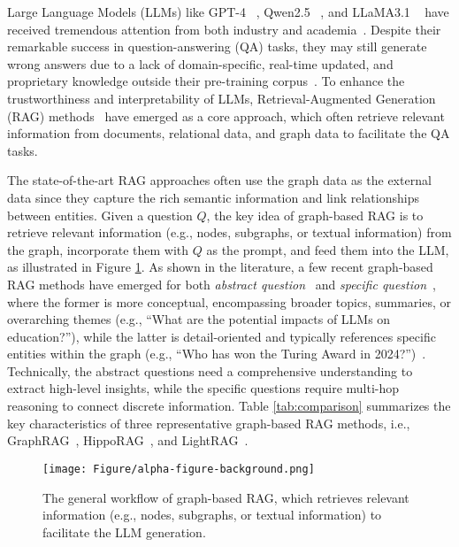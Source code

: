 Large Language Models (LLMs) like GPT-4 ~\cite{achiam2023gpt}, Qwen2.5 ~\cite{yang2024qwen2}, and LLaMA3.1 ~\cite{dubey2024llama} have received tremendous attention from both industry and academia~\cite{huang2024survey,liu2024survey,wang2024survey,zheng2024large,li2023large,nie2024survey,ghimire2024generative,wang2024large}.
% 
Despite their remarkable success in question-answering (QA) tasks, they may still generate wrong answers due to a lack of domain-specific, real-time updated, and proprietary knowledge outside their pre-training corpus~\cite{peng2024graph}. 
% 
To enhance the trustworthiness and interpretability of LLMs, Retrieval-Augmented Generation (RAG)  methods~\cite{fan2024survey,gao2023retrieval,hu2024rag,huang2024survey,wu2024retrieval,yu2024evaluation,zhao2024retrieval} have emerged as a core approach, which often retrieve relevant information from documents, relational data, and graph data to facilitate the QA tasks.

The state-of-the-art RAG approaches often use the graph data as the external data since they capture the rich semantic information and link relationships between entities. 
% 
Given a question $Q$, the key idea of graph-based RAG is to retrieve relevant information (e.g., nodes, subgraphs, or textual information) from the graph, incorporate them with $Q$ as the prompt, and feed them into the LLM, as illustrated in Figure \ref{fig:dual-tasks}.
%
As shown in the literature, a few recent graph-based RAG methods have emerged for both {\it abstract question}~\cite{edge2024local,guo2024lightrag,sarthi2024raptor} and {\it specific question}~\cite{guo2024lightrag,sarthi2024raptor,wu2024medical,wang2024knowledge,li2024dalk,gutierrez2024hipporag},
where the former is more conceptual, encompassing broader topics, summaries, or overarching themes (e.g., ``What are the potential impacts of LLMs on education?''), while the latter is detail-oriented and typically references specific entities within the graph  (e.g., ``Who has won the Turing Award in 2024?'')~\cite{guo2024lightrag}.
%
Technically, the abstract questions need a comprehensive understanding to extract high-level insights, while the specific questions require multi-hop reasoning to connect discrete information.
%
Table \ref{tab:comparison} summarizes the key characteristics of three representative graph-based RAG methods, i.e.,  GraphRAG~\cite{edge2024local}, HippoRAG~\cite{gutierrez2024hipporag}, and LightRAG~\cite{guo2024lightrag}.

\begin{figure}[t]
    \centering
    \texttt{[image: Figure/alpha-figure-background.png]}
    \caption{The general workflow of graph-based RAG, which retrieves relevant information (e.g., nodes, subgraphs, or textual information) to facilitate the LLM generation.}
    \label{fig:dual-tasks}
\end{figure}

